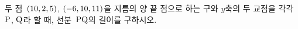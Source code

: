 두 점~$(10{,}\mkern3mu\mathopen{}2{,}\mkern3mu\mathopen{}5)$, $(-6{,}\mkern3mu\mathopen{}10{,}\mkern3mu\mathopen{}11)$을 지름의 양 끝 점으로 하는 구와 $y$축의 두 교점을 각각 $\mathrm{P}$, $\mathrm{Q}$라 할 때, 선분~$\mathrm{PQ}$의 길이를 구하시오.

